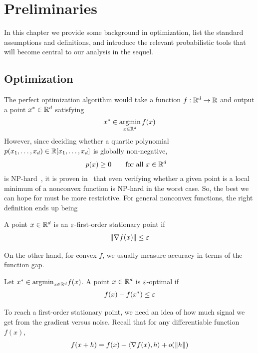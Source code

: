 \chapter{Preliminaries}
\label{chap:preliminaries}

In this chapter we provide some background in optimization, list the standard assumptions and definitions, and introduce the relevant probabilistic tools that will become central to our analysis in the sequel.

\section{Optimization}
The perfect optimization algorithm would take a function $f: \mathbb{R}^d \to \mathbb{R}$ and output a point $x^* \in \mathbb{R}^d$ satisfying
\begin{align*}
    x^* \in \operatorname*{argmin}_{x \in \mathbb{R}^d} f(x)
\end{align*}
However, since deciding whether a quartic polynomial $p(x_1, \ldots, x_d) \in \mathbb{R}[x_1, \ldots, x_d]$ is globally non-negative,
\begin{align*}
    &p(x) \geq 0 \qquad \text{for all } x \in \mathbb{R}^d
\end{align*}
is NP-hard~\cite{ahmadi2013nphardness}, it is proven in~\cite{anandkumar2016efficient} that even verifying whether a given point is a local minimum of a nonconvex function is NP-hard in the worst case. So, the best we can hope for must be more restrictive. For general nonconvex functions, the right definition ends up being
\begin{definition}
    A point $x \in \mathbb{R}^d$ is an $\varepsilon$-first-order stationary point if 
    \begin{align*}
        \left\lVert \nabla f(x) \right\rVert \leq \varepsilon
    \end{align*}
\end{definition}
On the other hand, for convex $f$, we usually measure accuracy in terms of the function gap.
\begin{definition}
    Let $x^* \in \mathrm{argmin}_{x \in \mathbb{R}^d} f(x)$. A point $x \in \mathbb{R}^d$ is $\varepsilon$-optimal if
    \begin{align*}
        f(x) - f(x^*) \leq \varepsilon
    \end{align*}
\end{definition}
To reach a first-order stationary point, we need an idea of how much signal we get from the gradient versus noise. Recall that for any differentiable function $f(x)$,
\begin{align*}
    f(x+h) = f(x) + \langle \nabla f(x), h \rangle + o(\left\lVert h \right\rVert)
\end{align*}
